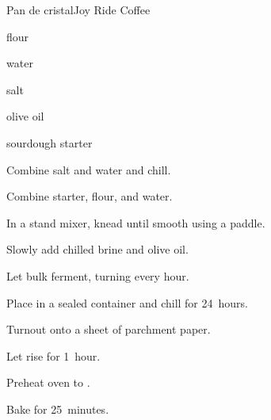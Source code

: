 \begin{recipe}{Pan de cristal}{Joy Ride Coffee}{}

\begin{ingredients}
\item {} flour
\item {} water
\item {} salt
\item {} olive oil
\item {} sourdough starter
\end{ingredients}

\begin{directions}
\item Combine salt and  water and chill.
\item Combine starter, flour, and  water.
\item In a stand mixer, knead until smooth using a paddle.
\item Slowly add chilled brine and olive oil.
\item Let bulk ferment, turning every hour.
\item Place in a sealed container and chill for 24~hours.
\item Turnout onto a sheet of parchment paper.
\item Let rise for 1~hour.
\item Preheat oven to .
\item Bake for 25~minutes.
\end{directions}

\end{recipe}
